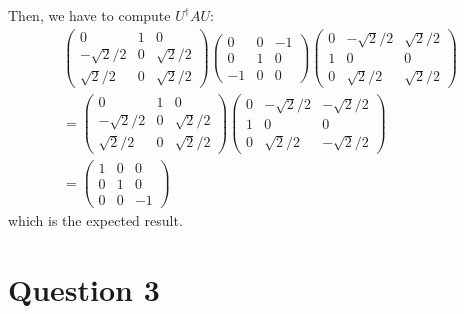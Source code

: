 \documentclass[12pt]{article}
\begin{document}
\begin{enumerate}
Then, we have to compute $U^\dagger A U$:
\begin{gather*}
    \begin{pmatrix}
        0 & 1 & 0 \\
        -\sqrt{2}/2 & 0 & \sqrt{2}/2 \\
        \sqrt{2}/2 & 0 & \sqrt{2}/2
    \end{pmatrix}
    \begin{pmatrix}
        0 & 0 & -1 \\ 0 & 1 & 0 \\ -1 & 0 & 0
    \end{pmatrix}
    \begin{pmatrix}
        0 & -\sqrt{2}/2 & \sqrt{2}/2 \\
        1 & 0 & 0 \\
        0 & \sqrt{2}/2 & \sqrt{2}/2
    \end{pmatrix}\\
    = 
    \begin{pmatrix}
        0 & 1 & 0 \\
        -\sqrt{2}/2 & 0 & \sqrt{2}/2 \\
        \sqrt{2}/2 & 0 & \sqrt{2}/2
    \end{pmatrix}
    \begin{pmatrix}
        0 & -\sqrt{2}/2 & -\sqrt{2}/2 \\
        1 & 0 & 0 \\
        0 & \sqrt{2}/2 & -\sqrt{2}/2
    \end{pmatrix}\\
    = 
    \begin{pmatrix}
        1 & 0 & 0 \\
        0 & 1 & 0 \\
        0 & 0 & -1
    \end{pmatrix}
\end{gather*}
which is the expected result.

\end{enumerate}

\section*{Question 3}
\end{document}
